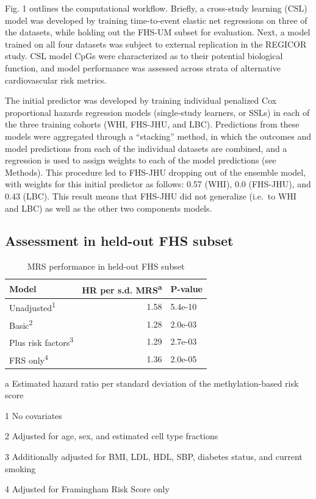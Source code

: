 \documentclass[]{article}
\begin{document}
Fig. 1 outlines the computational workflow. Briefly, a cross-study
learning (CSL) model was developed by training time-to-event elastic net
regressions on three of the datasets, while holding out the FHS-UM
subset for evaluation. Next, a model trained on all four datasets was
subject to external replication in the REGICOR study. CSL model CpGs
were characterized as to their potential biological function, and model
performance was assessed across strata of alternative cardiovascular
risk metrics.

The initial predictor was developed by training individual penalized Cox
proportional hazards regression models (single-study learners, or SSLs)
in each of the three training cohorts (WHI, FHS-JHU, and LBC).
Predictions from these models were aggregated through a ``stacking''
method, in which the outcomes and model predictions from each of the
individual datasets are combined, and a regression is used to assign
weights to each of the model predictions (see Methods). This procedure
led to FHS-JHU dropping out of the ensemble model, with weights for this
initial predictor as follows: 0.57 (WHI), 0.0 (FHS-JHU), and 0.43 (LBC).
This result means that FHS-JHU did not generalize (i.e.~to WHI and LBC)
as well as the other two components models.

\hypertarget{assessment-in-held-out-fhs-subset}{%
\subsection{Assessment in held-out FHS
subset}\label{assessment-in-held-out-fhs-subset}}

\begin{table}[t]

\caption{\label{tab:fhs-holdout}MRS performance in held-out FHS subset}
\centering
\begin{threeparttable}
\begin{tabular}{lrl}
\toprule
Model & HR per s.d. MRS\textsuperscript{a} & P-value\\
\midrule
Unadjusted\textsuperscript{1} & 1.58 & 5.4e-10\\
Basic\textsuperscript{2} & 1.28 & 2.0e-03\\
Plus risk factors\textsuperscript{3} & 1.29 & 2.7e-03\\
FRS only\textsuperscript{4} & 1.36 & 2.0e-05\\
\bottomrule
\end{tabular}
\begin{tablenotes}
\item[a] Estimated hazard ratio per standard deviation of the methylation-based risk score
\item[1] No covariates
\item[2] Adjusted for age, sex, and estimated cell type fractions
\item[3] Additionally adjusted for BMI, LDL, HDL, SBP, diabetes status, and current smoking
\item[4] Adjusted for Framingham Risk Score only
\end{tablenotes}
\end{threeparttable}
\end{table}
\end{document}
